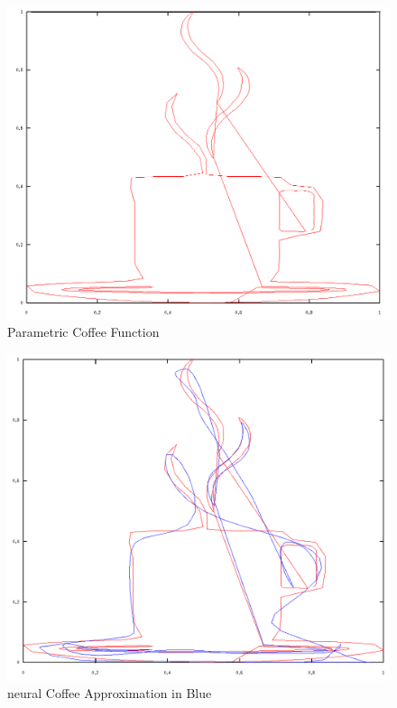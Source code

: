 \documentclass{article}
\begin{document}
\begin{figure}[tb]
	\begin{center}
		\includegraphics[scale=0.45]{img/coffee1}
	\end{center}
	\caption{Parametric Coffee Function}
	\label{fig:coffee1}
\end{figure}

\begin{figure}[tb]
	\begin{center}
		\includegraphics[scale=0.4]{img/coffee4}
	\end{center}
	\caption{neural Coffee Approximation in Blue}
	\label{fig:coffee4}
\end{figure}
\end{document}
